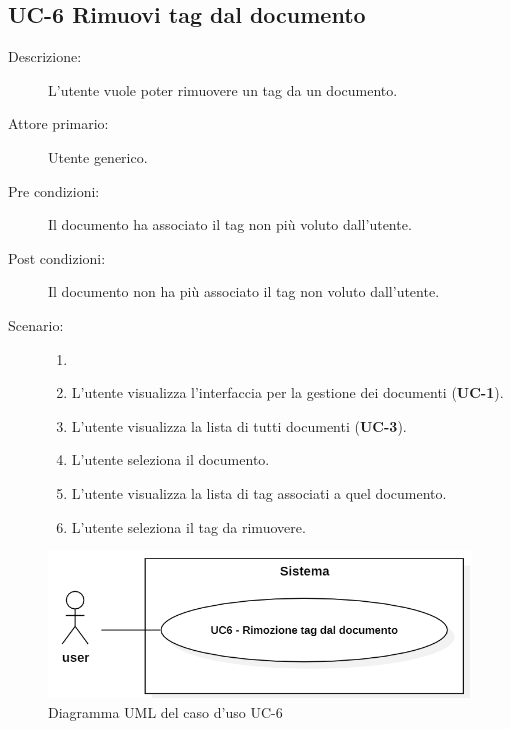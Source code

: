 \subsection{UC-6 Rimuovi tag dal documento}
\begin{description}
    \item[Descrizione:] L’utente vuole poter rimuovere un tag da un documento.
    \item[Attore primario:] Utente generico.
    \item[Pre condizioni:] Il documento ha associato il tag non più voluto dall’utente.
    \item[Post condizioni:] Il documento non ha più associato il tag non voluto dall’utente.
    \item[Scenario:]
    \begin{enumerate}
        \item[] 
        \item L’utente visualizza l'interfaccia per la gestione dei documenti (\textbf{UC-1}).
        \item L’utente visualizza la lista di tutti documenti (\textbf{UC-3}).
        \item L'utente seleziona il documento.
        \item L’utente visualizza la lista di tag associati a quel documento.
        \item L’utente seleziona il tag da rimuovere.
    \end{enumerate}
\end{description}

\begin{figure}[H]
    \centering
    \includegraphics[width=0.8\linewidth]{UC6.PNG}
    \caption{Diagramma UML del caso d'uso UC-6}
    \label{fig:UC6}
\end{figure}

